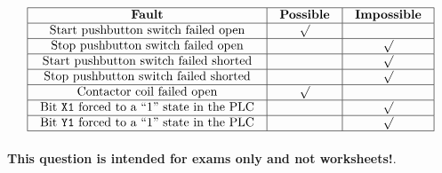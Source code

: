 






$$\vbox{\offinterlineskip
\halign{\strut
\vrule \quad\hfil # \ \hfil & 
\vrule \quad\hfil # \ \hfil & 
\vrule \quad\hfil # \ \hfil \vrule \cr
\noalign{\hrule}
%
{\bf Fault} & {\bf Possible} & {\bf Impossible} \cr
%
\noalign{\hrule}
%
Start pushbutton switch failed open & $\surd$ &  \cr
%
\noalign{\hrule}
%
Stop pushbutton switch failed open &  & $\surd$ \cr
%
\noalign{\hrule}
%
Start pushbutton switch failed shorted &  & $\surd$ \cr
%
\noalign{\hrule}
%
Stop pushbutton switch failed shorted &  & $\surd$ \cr
%
\noalign{\hrule}
%
Contactor coil failed open & $\surd$ &  \cr
%
\noalign{\hrule}
%
Bit {\tt X1} forced to a ``1'' state in the PLC &  & $\surd$ \cr
%
\noalign{\hrule}
%
Bit {\tt Y1} forced to a ``1'' state in the PLC &  & $\surd$ \cr
%
\noalign{\hrule}
} %
}$$ %








{\bf This question is intended for exams only and not worksheets!}.


